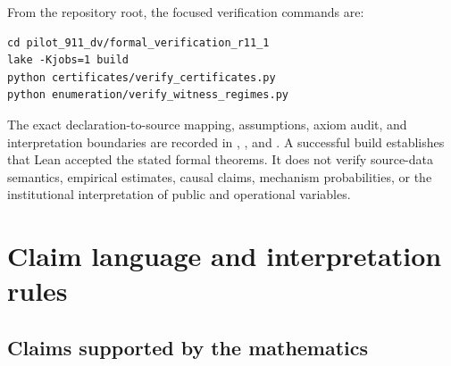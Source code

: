 \documentclass[11pt]{article}
\begin{document}
From the repository root, the focused verification commands are:

\begin{lstlisting}
cd pilot_911_dv/formal_verification_r11_1
lake -Kjobs=1 build
python certificates/verify_certificates.py
python enumeration/verify_witness_regimes.py
\end{lstlisting}

The exact declaration-to-source mapping, assumptions, axiom audit, and interpretation boundaries are recorded in , , and . A successful build establishes that Lean accepted the stated formal theorems. It does not verify source-data semantics, empirical estimates, causal claims, mechanism probabilities, or the institutional interpretation of public and operational variables.

\section{Claim language and interpretation rules}
\label{sec:claims}

\subsection{Claims supported by the mathematics}
\end{document}
